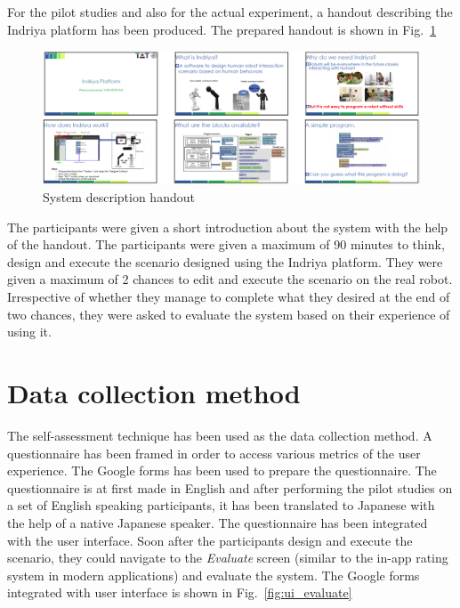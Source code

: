 For the pilot studies and also for the actual experiment, a handout describing the Indriya platform has been produced. The prepared handout is shown in Fig.~\ref{fig:handout}
\begin{figure}[H]
\centering
\includegraphics[width=\textwidth]{../thesis/assets/handout.png}
\caption[System description handout]{System description handout}
\label{fig:handout}
\end{figure}

The participants were given a short introduction about the system with the help of the handout. The participants were given a maximum of 90 minutes to think, design and execute the scenario designed using the Indriya platform. They were given a maximum of 2 chances to edit and execute the scenario on the real robot. Irrespective of whether they manage to complete what they desired at the end of two chances, they were asked to evaluate the system based on their experience of using it.

\section{Data collection method}
The self-assessment \cite{bethel2010review} technique has been used as the data collection method. A questionnaire has been framed in order to access various metrics of the user experience. The Google forms has been used to prepare the questionnaire. The questionnaire is at first made in English and after performing the pilot studies on a set of English speaking participants, it has been translated to Japanese with the help of a native Japanese speaker. The questionnaire has been integrated with the user interface. Soon after the participants design and execute the scenario, they could navigate to the \emph{Evaluate} screen (similar to the in-app rating system in modern applications) and evaluate the system. The Google forms integrated with user interface is shown in Fig.~\ref{fig:ui_evaluate}

